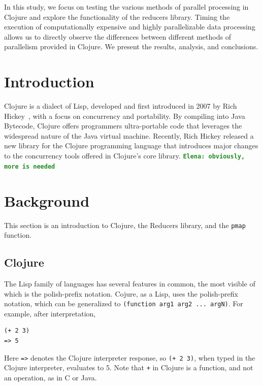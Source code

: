 \documentclass[12pt]{article}
\newcommand{\comment}[1]{{\bf \tt  {#1}}}
\newcommand{\emcomment}[1]{\textcolor{ForestGreen}{\comment{Elena: {#1}}}}
\newcommand{\clocode}[1]{{\texttt {#1}}}
\begin{document}
In this study, we focus on testing the various methods of parallel processing in Clojure and explore the functionality of the reducers library. Timing the execution of computationally expensive and highly parallelizable data processing allows us to directly observe the differences between different methods of parallelism provided in Clojure. We present the results, analysis, and conclusions.


 \newpage

\setcounter{page}{1}


\section{Introduction}\label{sec:intro}

	 Clojure is a dialect of Lisp, developed and first introduced in 2007 by Rich Hickey~\cite{Hickey:2008}, with a focus on concurrency and portability. By compiling into Java Bytecode, Clojure offers programmers ultra-portable code that leverages the widespread nature of the Java virtual machine. 
Recently, Rich Hickey released a new library for the Clojure programming language that introduces major changes to the concurrency tools offered in Clojure's core library.
\emcomment{obviously, more is needed}

\section{Background}\label{sec:background}
This section is an introduction to Clojure, the Reducers library, and the \clocode{pmap} function. 
\subsection{Clojure}\label{sec:clojure}
The Lisp family of languages has several features in common, the most visible of which is the polish-prefix notation. Cojure, as a Lisp, uses the polish-prefix notation, which can be generalized to \clocode{(function arg1 arg2 ... argN)}. For example, after interpretation, 
\begin{verbatim}
(+ 2 3)
=> 5
\end{verbatim}
Here \clocode{=>} denotes the Clojure interpreter response, so \clocode{(+ 2 3)}, when typed in the Clojure interpreter, evaluates to 5. 
Note that \clocode{+} in Clojure is a function, and not an operation, as in C or Java. 
\end{document}
